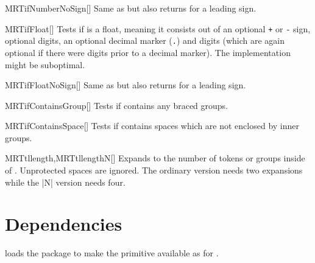 \begin{describemacroTF}[G,N,GN]{MRTifNumberNoSign}[]
  Same as  but also returns  for a leading sign.
\end{describemacroTF}

\begin{describemacroTF}[G,N,GN]{MRTifFloat}[]
  Tests if  is a float, meaning it consists out of an optional
  \texttt{+} or \texttt{-} sign, optional digits, an optional decimal marker
  (\texttt{.}) and digits (which are again optional if there were digits prior
  to a decimal marker). The implementation might be suboptimal.
\end{describemacroTF}

\begin{describemacroTF}[G,N,GN]{MRTifFloatNoSign}[]
  Same as  but also returns  for a leading sign.
\end{describemacroTF}

\begin{describemacroTF}[G,N,GN]{MRTifContainsGroup}[]
  Tests if  contains any braced groups.
\end{describemacroTF}

\begin{describemacroTF}[G,N,GN]{MRTifContainsSpace}[]
  Tests if  contains spaces which are not enclosed by inner groups.
\end{describemacroTF}

\begin{describemacro}{MRTtllength,MRTtllengthN}[]
  Expands to the number of tokens or groups inside of . Unprotected
  spaces are ignored. The ordinary version needs two expansions while the |N|
  version needs four.
\end{describemacro}

\section{Dependencies}
 loads the  package to make the 
primitive  available as  for .
